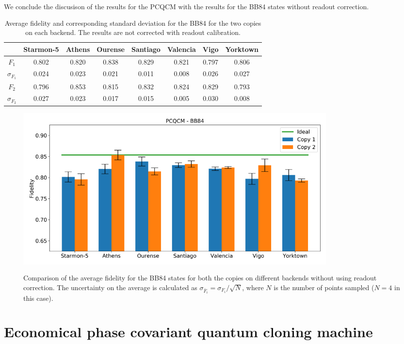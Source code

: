 We conclude the discusison of the results for the PCQCM with the results for the BB84 states without readout correction.
\begin{table}[H]
    \centering
    \begin{tabular}{|c|c|c|c|c|c|c|c|}
    \hline
    \textbf{} & \textbf{Starmon-5} & \textbf{Athens} & \textbf{Ourense} & \textbf{Santiago} & \textbf{Valencia} & \textbf{Vigo} & \textbf{Yorktown} \\ \hline
    $F_1$              & 0.802 & 0.820 & 0.838 & 0.829 & 0.821 & 0.797 & 0.806 \\ \hline
    $\sigma_{F_1}$     & 0.024 & 0.023 & 0.021 & 0.011 & 0.008 & 0.026 & 0.027 \\ \hline
    $F_2$              & 0.796 & 0.853 & 0.815 & 0.832 & 0.824 & 0.829 & 0.793 \\ \hline
    $\sigma_{F_2}$     & 0.027 & 0.023 & 0.017 & 0.015 & 0.005 & 0.030 & 0.008 \\ \hline
    \end{tabular}
    \caption{Average fidelity and corresponding standard deviation for the BB84 for the two copies on each backend. The results are not corrected with readout calibration.}
    \label{tab:results_pcqcm_bb84_not_corrected}
\end{table}
\begin{figure}[H]
  \centering
          \includegraphics[width=0.8\textwidth]{Figures/PhaseCovariant/Histograms/histo_bb84.png}
      \label{fig:pc_histo_bb84_corrected}
      \caption{Comparison of the average fidelity for the BB84 states for both the copies on different backends without using readout correction. The uncertainty on the average is calculated as $\sigma_{\overline{F}_i}=\sigma_{F_i}/\sqrt{N}$, where $N$ is the number of points sampled ($N=4$ in this case).}
\end{figure}

\section{Economical phase covariant quantum cloning machine}
